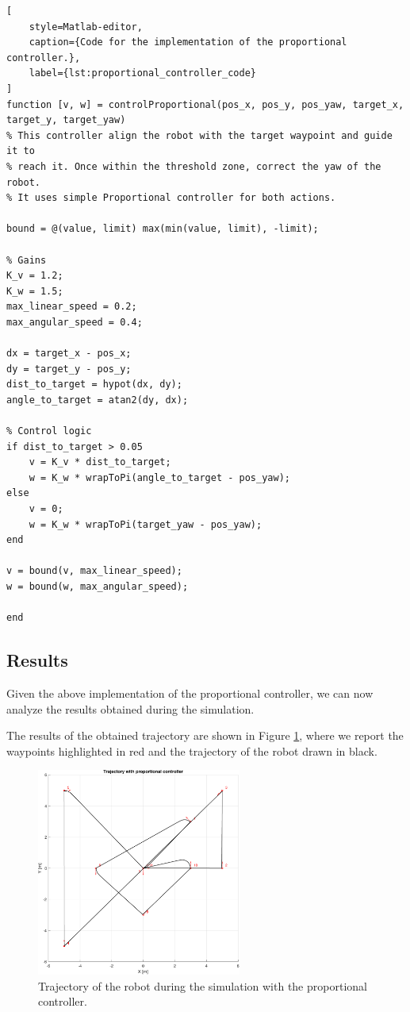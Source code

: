 \begin{lstlisting}[
    style=Matlab-editor,
    caption={Code for the implementation of the proportional controller.},
    label={lst:proportional_controller_code}
]
function [v, w] = controlProportional(pos_x, pos_y, pos_yaw, target_x, target_y, target_yaw)
% This controller align the robot with the target waypoint and guide it to
% reach it. Once within the threshold zone, correct the yaw of the robot.
% It uses simple Proportional controller for both actions.

bound = @(value, limit) max(min(value, limit), -limit);

% Gains
K_v = 1.2;
K_w = 1.5;
max_linear_speed = 0.2;
max_angular_speed = 0.4;

dx = target_x - pos_x;
dy = target_y - pos_y;
dist_to_target = hypot(dx, dy);
angle_to_target = atan2(dy, dx);

% Control logic
if dist_to_target > 0.05
    v = K_v * dist_to_target;
    w = K_w * wrapToPi(angle_to_target - pos_yaw);
else
    v = 0;
    w = K_w * wrapToPi(target_yaw - pos_yaw);
end

v = bound(v, max_linear_speed);
w = bound(w, max_angular_speed);

end
\end{lstlisting}



\subsection{Results}
\label{subsec:results_proportional_controller}

Given the above implementation of the proportional controller, we can now analyze the results obtained during the simulation.

The results of the obtained trajectory are shown in Figure \ref{fig:proportional_controller_trajectory}, where we report the waypoints highlighted in red and the trajectory of the robot drawn in black.

\begin{figure}[H]
    \centering
    \includegraphics[width=0.6\textwidth]{./img/MATLAB/trajectory_proportional.pdf}
    \caption{Trajectory of the robot during the simulation with the proportional controller.}
    \label{fig:proportional_controller_trajectory}
\end{figure}

